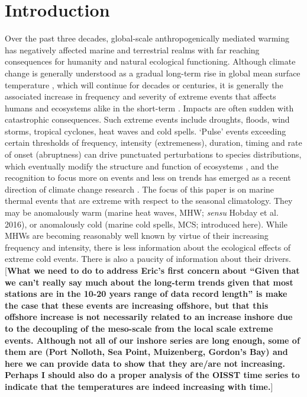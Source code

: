 \documentclass[a4paper,10pt,review]{elsarticle}
\begin{document}
\linenumbers

\section{Introduction}

Over the past three decades, global-scale anthropogenically mediated warming has negatively affected marine and terrestrial realms with far reaching consequences for humanity and natural ecological functioning. Although climate change is generally understood as a gradual long-term rise in global mean surface temperature \cite{IPCC2014}, which will continue for decades or centuries, it is generally the associated increase in frequency and severity of extreme events that affects humans and ecosystems alike in the short-term \cite{Easterling2000}. Impacts are often sudden with catastrophic consequences. Such extreme events include droughts, floods, wind storms, tropical cyclones, heat waves and cold spells. `Pulse' events exceeding certain thresholds of frequency, intensity (extremeness), duration, timing and rate of onset (abruptness) can drive punctuated perturbations to species distributions, which eventually modify the structure and function of ecosystems \cite{Wernberg2013, Rehage2016}, and the recognition to focus more on events and less on trends has emerged as a recent direction of climate change research \cite{Jentsch2007}. The focus of this paper is on marine thermal events that are extreme with respect to the seasonal climatology. They may be anomalously warm (marine heat waves, MHW; \emph{sensu} Hobday et al. 2016), or anomalously cold (marine cold spells, MCS; introduced here). While MHWs are becoming reasonably well known by virtue of their increasing frequency and intensity, there is less information about the ecological effects of extreme cold events. There is also a paucity of information about their drivers. [\textbf{What we need to do to address Eric's first concern about ``Given that we can’t really say much about the long-term trends given that most stations are in the 10-20 years range of data record length'' is make the case that these events are increasing offshore, but that this offshore increase is not necessarily related to an increase inshore due to the decoupling of the meso-scale from the local scale extreme events. Although not all of our inshore series are long enough, some of them are (Port Nolloth, Sea Point, Muizenberg, Gordon's Bay) and here we can provide data to show that they are/are not increasing. Perhaps I should also do a proper analysis of the OISST time series to indicate that the temperatures are indeed increasing with time.}]
\end{document}
